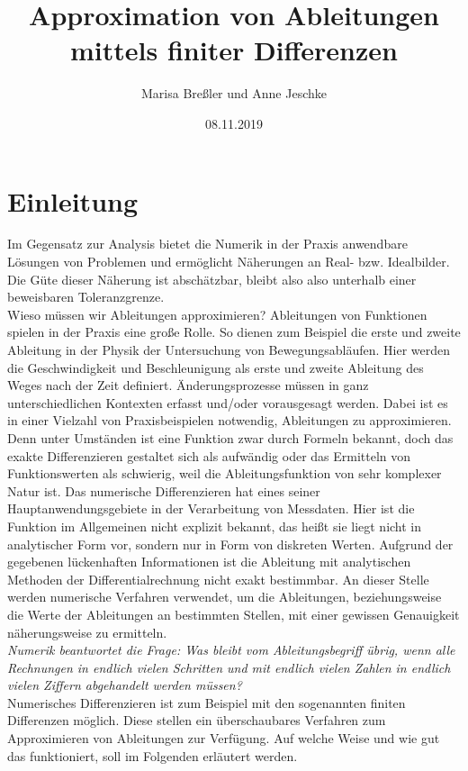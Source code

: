 \documentclass{scrartcl}
\begin{document}
\title{Approximation von Ableitungen\\mittels finiter Differenzen}
\author{Marisa Breßler und Anne Jeschke}
\date{08.11.2019}
\maketitle
\tableofcontents
\pagebreak \section{Einleitung}
\label{sec:einleitung}
Im Gegensatz zur Analysis bietet die Numerik in der Praxis anwendbare Lösungen von Problemen und ermöglicht Näherungen an Real- bzw. Idealbilder. Die Güte dieser Näherung ist abschätzbar, bleibt also also unterhalb einer beweisbaren Toleranzgrenze. \\
Wieso müssen wir Ableitungen approximieren? Ableitungen von Funktionen spielen in der Praxis eine große Rolle. So dienen zum Beispiel die erste und zweite Ableitung in der Physik der Untersuchung von Bewegungsabläufen. Hier werden die Geschwindigkeit und Beschleunigung als erste und zweite Ableitung des Weges nach der Zeit definiert. Änderungsprozesse müssen in ganz unterschiedlichen Kontexten erfasst und/oder vorausgesagt werden. Dabei ist es in einer Vielzahl von Praxisbeispielen notwendig, Ableitungen zu approximieren. Denn unter Umständen ist eine Funktion zwar durch Formeln bekannt, doch das exakte Differenzieren gestaltet sich als aufwändig oder das Ermitteln von Funktionswerten als schwierig, weil die Ableitungsfunktion von sehr komplexer Natur ist. Das numerische Differenzieren hat eines seiner Hauptanwendungsgebiete in der Verarbeitung von Messdaten. Hier ist die Funktion im Allgemeinen nicht explizit bekannt, das heißt sie liegt nicht in analytischer Form vor, sondern nur in Form von diskreten Werten. Aufgrund der gegebenen lückenhaften Informationen ist die Ableitung mit analytischen Methoden der Differentialrechnung nicht exakt bestimmbar. An dieser Stelle werden numerische Verfahren verwendet, um die Ableitungen, beziehungsweise die Werte der Ableitungen an bestimmten Stellen, mit einer gewissen Genauigkeit näherungsweise zu ermitteln. \\
\linebreak
\textit{Numerik beantwortet die Frage: Was bleibt vom Ableitungsbegriff übrig, wenn alle Rechnungen in endlich vielen Schritten und mit endlich vielen Zahlen in endlich vielen Ziffern abgehandelt werden müssen?}\cite{schneebeli}\\
\linebreak
Numerisches Differenzieren ist zum Beispiel mit den sogenannten finiten Differenzen möglich. Diese stellen ein überschaubares Verfahren zum Approximieren von Ableitungen zur Verfügung. Auf welche Weise und wie gut das funktioniert, soll im Folgenden erläutert werden. \\
\end{document}

